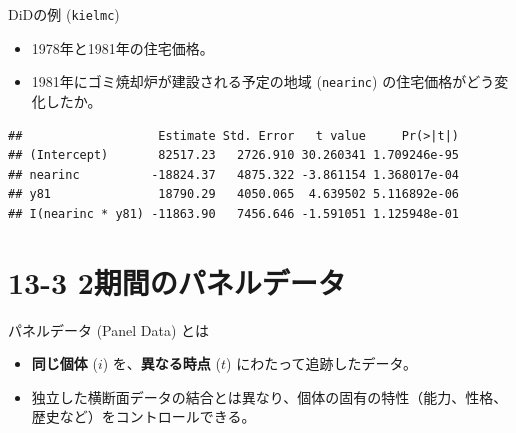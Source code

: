 \documentclass[
  ignorenonframetext,
]{beamer}
\newenvironment{Shaded}{\begin{snugshade}}{\end{snugshade}}
\newcommand{\AttributeTok}[1]{\textcolor[rgb]{0.13,0.29,0.53}{#1}}
\newcommand{\CommentTok}[1]{\textcolor[rgb]{0.56,0.35,0.01}{\textit{#1}}}
\newcommand{\DecValTok}[1]{\textcolor[rgb]{0.00,0.00,0.81}{#1}}
\newcommand{\FunctionTok}[1]{\textcolor[rgb]{0.13,0.29,0.53}{\textbf{#1}}}
\newcommand{\NormalTok}[1]{#1}
\newcommand{\OtherTok}[1]{\textcolor[rgb]{0.56,0.35,0.01}{#1}}
\newcommand{\SpecialCharTok}[1]{\textcolor[rgb]{0.81,0.36,0.00}{\textbf{#1}}}
\providecommand{\tightlist}{%
  \setlength{\itemsep}{0pt}\setlength{\parskip}{0pt}}
\begin{document}
\begin{frame}[fragile]{DiDの例 (\texttt{kielmc})}
\label{didux306eux4f8b-kielmc}
\begin{itemize}
\tightlist
\item
  1978年と1981年の住宅価格。
\item
  1981年にゴミ焼却炉が建設される予定の地域 (\texttt{nearinc})
  の住宅価格がどう変化したか。
\end{itemize}

\footnotesize

\begin{Shaded}
\end{Shaded}

\begin{verbatim}
##                   Estimate Std. Error   t value     Pr(>|t|)
## (Intercept)       82517.23   2726.910 30.260341 1.709246e-95
## nearinc          -18824.37   4875.322 -3.861154 1.368017e-04
## y81               18790.29   4050.065  4.639502 5.116892e-06
## I(nearinc * y81) -11863.90   7456.646 -1.591051 1.125948e-01
\end{verbatim}

\normalsize
\end{frame}

\section{13-3
2期間のパネルデータ}\label{ux671fux9593ux306eux30d1ux30cdux30ebux30c7ux30fcux30bf}

\begin{frame}{パネルデータ (Panel Data) とは}
\label{ux30d1ux30cdux30ebux30c7ux30fcux30bf-panel-data-ux3068ux306f}
\begin{itemize}
\tightlist
\item
  \textbf{同じ個体} (\(i\)) を、\textbf{異なる時点} (\(t\))
  にわたって追跡したデータ。
\item
  独立した横断面データの結合とは異なり、個体の固有の特性（能力、性格、歴史など）をコントロールできる。
\end{itemize}
\end{frame}
\end{document}
